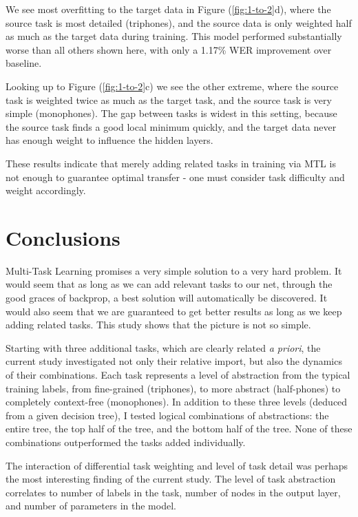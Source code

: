 \documentclass[a4paper]{article}
\begin{document}
We see most overfitting to the target data in Figure (\ref{fig:1-to-2}d), where the source task is most detailed (triphones), and the source data is only weighted half as much as the target data during training. This model performed substantially worse than all others shown here, with only a 1.17\% WER improvement over baseline.

Looking up to Figure (\ref{fig:1-to-2}c) we see the other extreme, where the source task is weighted twice as much as the target task, and the source task is very simple (monophones). The gap between tasks is widest in this setting, because the source task finds a good local minimum quickly, and the target data never has enough weight to influence the hidden layers.

These results indicate that merely adding related tasks in training via MTL is not enough to guarantee optimal transfer - one must consider task difficulty and weight accordingly. 




\section{Conclusions}

Multi-Task Learning promises a very simple solution to a very hard problem. It would seem that as long as we can add relevant tasks to our net, through the good graces of backprop, a best solution will automatically be discovered. It would also seem that we are guaranteed to get better results as long as we keep adding related tasks. This study shows that the picture is not so simple.

Starting with three additional tasks, which are clearly related \textit{a priori}, the current study investigated not only their relative import, but also the dynamics of their combinations. Each task represents a level of abstraction from the typical training labels, from fine-grained (triphones), to more abstract (half-phones) to completely context-free (monophones). In addition to these three levels (deduced from a given decision tree), I tested logical combinations of abstractions: the entire tree, the top half of the tree, and the bottom half of the tree. None of these combinations outperformed the tasks added individually.

The interaction of differential task weighting and level of task detail was perhaps the most interesting finding of the current study. The level of task abstraction correlates to number of labels in the task, number of nodes in the output layer, and number of parameters in the model.
\end{document}
